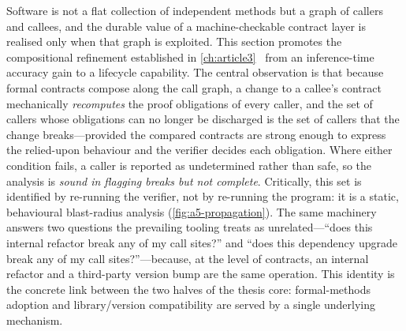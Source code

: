 Software is not a flat collection of independent methods but a graph of callers and callees, and the durable value of a machine-checkable contract layer is realised only when that graph is exploited. This section promotes the compositional refinement established in \cref{ch:article3}~\cite{edmonds_article3} from an inference-time accuracy gain to a lifecycle capability. The central observation is that because formal contracts compose along the call graph, a change to a callee's contract mechanically \emph{recomputes} the proof obligations of every caller, and the set of callers whose obligations can no longer be discharged is the set of callers that the change breaks---provided the compared contracts are strong enough to express the relied-upon behaviour and the verifier decides each obligation. Where either condition fails, a caller is reported as undetermined rather than safe, so the analysis is \emph{sound in flagging breaks but not complete}. Critically, this set is identified by re-running the verifier, not by re-running the program: it is a static, behavioural blast-radius analysis (\cref{fig:a5-propagation}). The same machinery answers two questions the prevailing tooling treats as unrelated---``does this internal refactor break any of my call sites?'' and ``does this dependency upgrade break any of my call sites?''---because, at the level of contracts, an internal refactor and a third-party version bump are the same operation. This identity is the concrete link between the two halves of the thesis core: formal-methods adoption and library/version compatibility are served by a single underlying mechanism.

